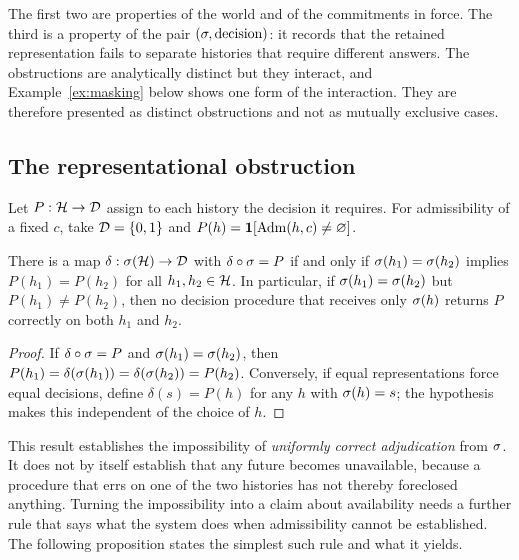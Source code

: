 The first two are properties of the world and of the commitments in force. The third is a property of the pair $(\sigma,\text{decision})$: it records that the retained representation fails to separate histories that require different answers. The obstructions are analytically distinct but they interact, and Example~\ref{ex:masking} below shows one form of the interaction. They are therefore presented as distinct obstructions and not as mutually exclusive cases.

\subsection*{The representational obstruction}

Let $P:\mathcal{H}\to\mathcal{D}$ assign to each history the decision it requires. For admissibility of a fixed $c$, take $\mathcal{D}=\{0,1\}$ and $P(h)=\mathbf{1}[\operatorname{Adm}(h,c)\neq\varnothing]$.

\begin{established}\label{prop:factorization}
There is a map $\delta:\sigma(\mathcal{H})\to\mathcal{D}$ with $\delta\circ\sigma=P$ if and only if $\sigma(h_1)=\sigma(h_2)$ implies $P(h_1)=P(h_2)$ for all $h_1,h_2\in\mathcal{H}$. In particular, if $\sigma(h_1)=\sigma(h_2)$ but $P(h_1)\neq P(h_2)$, then no decision procedure that receives only $\sigma(h)$ returns $P$ correctly on both $h_1$ and $h_2$.
\end{established}
\begin{proof}
If $\delta\circ\sigma=P$ and $\sigma(h_1)=\sigma(h_2)$, then $P(h_1)=\delta(\sigma(h_1))=\delta(\sigma(h_2))=P(h_2)$. Conversely, if equal representations force equal decisions, define $\delta(s)=P(h)$ for any $h$ with $\sigma(h)=s$; the hypothesis makes this independent of the choice of $h$.
\end{proof}

This result establishes the impossibility of \emph{uniformly correct adjudication} from $\sigma$. It does not by itself establish that any future becomes unavailable, because a procedure that errs on one of the two histories has not thereby foreclosed anything. Turning the impossibility into a claim about availability needs a further rule that says what the system does when admissibility cannot be established. The following proposition states the simplest such rule and what it yields.

